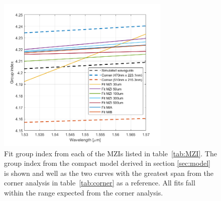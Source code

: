 \documentclass[journal]{IEEEtran}
\begin{document}

\begin{figure}[t!]
  \centering
  \includegraphics[width = 3.25in]{fig/compiled_ng_fits.png}
  \caption{Fit group index from each of the MZIs listed in table~\ref{tab:MZI}. The group index from the compact model derived in section \ref{sec:model} is shown and well as the two curves with the greatest span from the corner analysis in table~\ref{tab:corner} as a reference. All fits fall within the range expected from the corner analysis.}
  \label{fig:ngs}
\end{figure}
\end{document}

